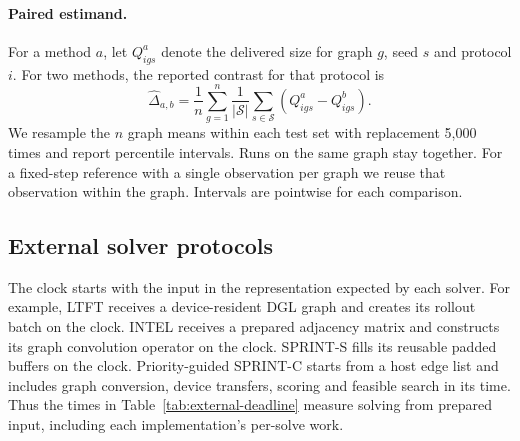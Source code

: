 \paragraph{Paired estimand.}
For a method \(a\), let \(Q_{igs}^{a}\) denote the delivered size for graph \(g\), seed \(s\) and protocol \(i\). For two methods, the reported contrast for that protocol is
\begin{equation}
 \widehat{\Delta}_{a,b}=\frac{1}{n}\sum_{g=1}^n
       \frac{1}{|\mathcal S|}\sum_{s\in\mathcal S}
               (Q_{igs}^{a}-Q_{igs}^{b}).
\end{equation}
We resample the \(n\) graph means within each test set with replacement 5,000 times and report percentile intervals. Runs on the same graph stay together. For a fixed-step reference with a single observation per graph we reuse that observation within the graph. Intervals are pointwise for each comparison.

\subsection{External solver protocols}
The clock starts with the input in the representation expected by each solver. For example, LTFT receives a device-resident DGL graph and creates its rollout batch on the clock. INTEL receives a prepared adjacency matrix and constructs its graph convolution operator on the clock. SPRINT-S fills its reusable padded buffers on the clock. Priority-guided SPRINT-C starts from a host edge list and includes graph conversion, device transfers, scoring and feasible search in its time. Thus the times in Table~\ref{tab:external-deadline} measure solving from prepared input, including each implementation's per-solve work.

